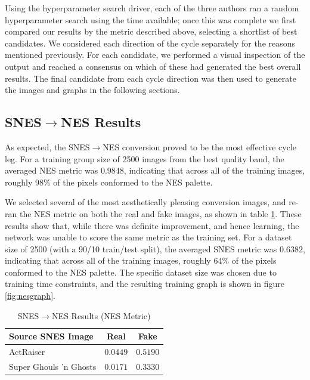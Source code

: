 \documentclass[10pt,twocolumn,letterpaper]{article}
\begin{document}

Using the hyperparameter search driver, each of the three authors ran a random hyperparameter search using the time available; once this was complete we first compared our results by the metric described above, selecting a shortlist of best candidates. We considered each direction of the cycle separately for the reasons mentioned previously. For each candidate, we performed a visual inspection of the output and reached a consensus on which of these had generated the best overall results. The final candidate from each cycle direction was then used to generate the images and graphs in the following sections.


\subsection{SNES$\rightarrow$NES Results}

As expected, the SNES$\rightarrow$NES conversion proved to be the most effective cycle leg. For a training group size of 2500 images from the best quality band, the averaged NES metric was $0.9848$, indicating that across all of the training images, roughly 98\% of the pixels conformed to the NES palette.


We selected several of the most aesthetically pleasing conversion images, and re-ran the NES metric on both the real and fake images, as shown in table \ref{tab:nesresults}.
These results show that, while there was definite improvement, and hence learning, the network was unable to score the same metric as the training set. For a dataset size of 2500 (with a 90/10 train/test split), the averaged SNES metric was $0.6382$, indicating that across all of the training images, roughly 64\% of the pixels conformed to the NES palette. The specific dataset size was chosen due to training time constraints, and the resulting training graph is shown in figure \ref{fig:nesgraph}.

\begin{table}[H]
   \begin{center}
      \begin{tabular}{|l|c|c|}
         \hline
         Source SNES Image      & Real     & Fake     \\
         \hline\hline
         ActRaiser              & $0.0449$ & $0.5190$ \\
         Super Ghouls 'n Ghosts & $0.0171$ & $0.3330$ \\
         \hline
      \end{tabular}
   \end{center}
   \caption{SNES$\rightarrow$NES Results (NES Metric)}
   \label{tab:nesresults}
\end{table}
\end{document}
